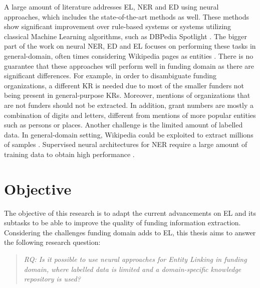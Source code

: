 \documentclass{report}
\theoremstyle{definition}
\theoremstyle{remark}
\begin{document}
A large amount of literature addresses EL, NER and ED using neural approaches, which includes the state-of-the-art methods \cite{REL,LUKE,mulang} as well. These methods show significant improvement over rule-based systems or systems utilizing classical Machine Learning algorithms, such as DBPedia Spotlight \cite{dbpediaspotlight}. The bigger part of the work on neural NER, ED and EL focuses on performing these tasks in general-domain, often times considering Wikipedia pages as entities \cite{nlpnotes}. There is no guarantee that these approaches will perform well in funding domain as there are significant differences. For example, in order to disambiguate funding organizations, a different KR is needed due to most of the smaller funders not being present in general-purpose KRs. Moreover, mentions of organizations that are not funders should not be extracted. In addition, grant numbers are mostly a combination of digits and letters, different from mentions of more popular entities such as persons or places. Another challenge is the limited amount of labelled data. In general-domain setting, Wikipedia could be exploited to extract millions of samples \cite{bunescu-pasca-2006-using}. Supervised neural architectures for NER require a large amount of training data to obtain high performance \cite{NERsurvey}. 

\section{Objective}

The objective of this research is to adapt the current advancements on EL and its subtasks to be able to improve the quality of funding information extraction. Considering the challenges funding domain adds to EL, this thesis aims to answer the following research question:

\begin{quote}\emph{RQ: Is it possible to use neural approaches for Entity Linking in funding domain, where labelled data is limited and a domain-specific knowledge repository is used?}\end{quote}
\end{document}
